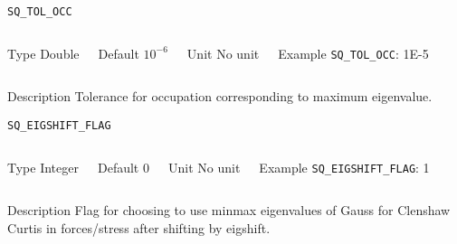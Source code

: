\begin{frame}[allowframebreaks]{\texttt{SQ\_TOL\_OCC}} \label{SQ_TOL_OCC}
\vspace*{-12pt}
\begin{columns}
\begin{block}{Type}
Double
\end{block}

\begin{block}{Default}
$10^{-6}$
\end{block}

\begin{block}{Unit}
No unit
\end{block}

\begin{block}{Example}
\texttt{SQ\_TOL\_OCC}: 1E-5
\end{block}
\end{columns}

\begin{block}{Description}
Tolerance for occupation corresponding to maximum eigenvalue.
\end{block}

\end{frame}




\begin{frame}[allowframebreaks]{\texttt{SQ\_EIGSHIFT\_FLAG}} \label{SQ_EIGSHIFT_FLAG}
\vspace*{-12pt}
\begin{columns}
\begin{block}{Type}
Integer
\end{block}

\begin{block}{Default}
0
\end{block}

\begin{block}{Unit}
No unit
\end{block}

\begin{block}{Example}
\texttt{SQ\_EIGSHIFT\_FLAG}: 1
\end{block}
\end{columns}

\begin{block}{Description}
Flag for choosing to use minmax eigenvalues of Gauss for Clenshaw Curtis in forces/stress after shifting by eigshift.
\end{block}

\end{frame}


